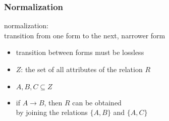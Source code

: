 \documentclass[dvipsnames]{beamer}
\begin{document}
\begin{frame}
  \frametitle{Normalization}

  \begin{definition}
    \alert{normalization}:\\
      transition from one form to the next, narrower form

    \begin{itemize}
      \item transition between forms must be lossless
    \end{itemize}
  \end{definition}

  \pause
  \begin{theorem}[Heath]
    \begin{itemize}
      \item $Z$: the set of all attributes of the relation $R$
      \item $A,B,C \subseteq Z$

      \pause
      \item if $A \rightarrow B$, then $R$ can be obtained\\
	by joining the relations $\{A,B\}$ and $\{A,C\}$
    \end{itemize}
  \end{theorem}
\end{frame}
\end{document}
